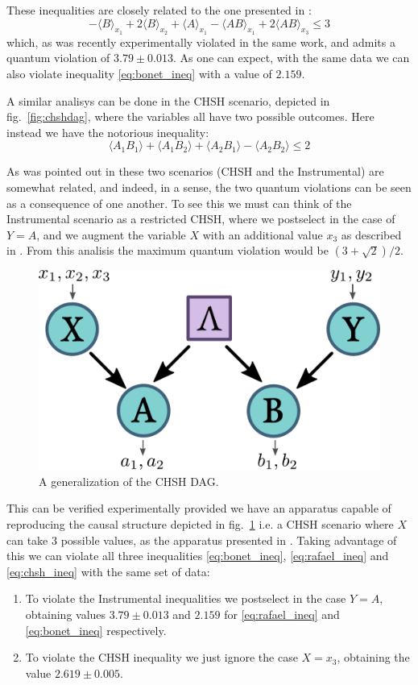\documentclass{article}
\newcommand{\avg}[1]{\langle#1\rangle}
\begin{document}
These inequalities are closely related to the one presented in \cite{chaves2018}:
\begin{equation}
    -\avg{B}_{x_1} + 2 \avg{B}_{x_2} + \avg{A}_{x_1} - \avg{AB}_{x_1} +
    2\avg{AB}_{x_3} \le 3  
    \label{eq:rafael_ineq}
\end{equation}
which, as was recently experimentally violated in the same work, and admits a
quantum violation of $3.79 \pm 0.013$.
As one can expect, with the same data we can also violate inequality
\eqref{eq:bonet_ineq} with a value of $2.159$.

A similar analisys can be done in the CHSH scenario, depicted in
fig.~\ref{fig:chshdag},
where the variables all have two possible outcomes.
Here instead we have the notorious inequality:
\begin{equation}
    \avg{A_1B_1} + \avg{A_1B_2} + \avg{A_2B_1} - \avg{A_2B_2} \le 2
    \label{eq:chsh_ineq}
\end{equation}

As was pointed out in \cite{himbeeck2018} these two scenarios (CHSH and the Instrumental)
are somewhat related, and indeed, in a sense, the two quantum violations can be
seen as a consequence of one another.
To see this we must can think of the Instrumental scenario as a restricted CHSH,
where we postselect in the case of $Y = A$, and we augment the variable $X$ with
an additional value $x_3$ as described in \cite{himbeeck2018}.
From this analisis the maximum quantum violation would be $(3 + \sqrt{2})/2$.

\begin{figure}[h]
    \centering
    \includegraphics[width=.5\textwidth]{images/genchshdag.pdf}
    \caption{A generalization of the CHSH DAG.}
    \label{fig:genchshdag}
\end{figure}
This can be verified experimentally provided we have an apparatus capable of
reproducing the causal structure depicted in fig.~\ref{fig:genchshdag} i.e. a CHSH scenario
where $X$ can take 3 possible values, as the apparatus presented in
\cite{chaves2018}.
Taking advantage of this we can violate all three inequalities
\eqref{eq:bonet_ineq}, \eqref{eq:rafael_ineq} and \eqref{eq:chsh_ineq} with the same set of
data:
\begin{enumerate}
    \item To violate the Instrumental inequalities we postselect in the case
        $Y = A$, obtaining values $3.79 \pm 0.013$ and $2.159$ for \eqref{eq:rafael_ineq} and
        \eqref{eq:bonet_ineq} respectively.
    \item To violate the CHSH inequality we just ignore the case $X = x_3$,
        obtaining the value $2.619 \pm 0.005$.
\end{enumerate}
\end{document}
